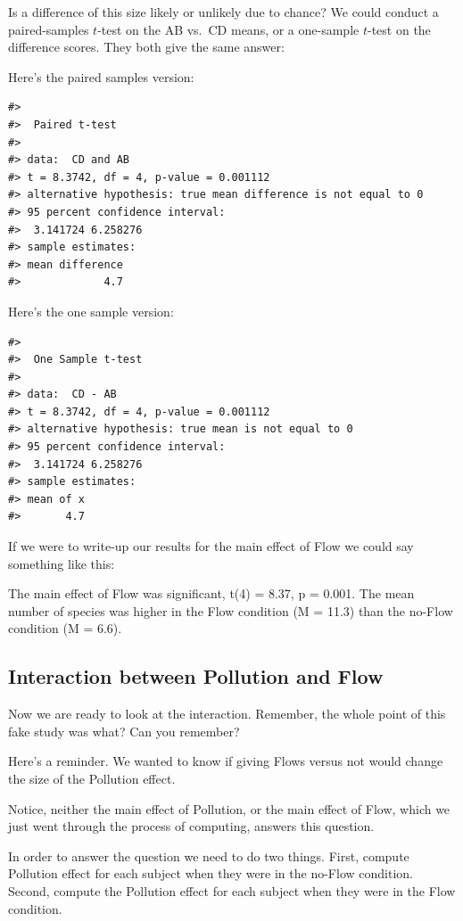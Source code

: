 \documentclass[
  letterpaper,
  DIV=11,
  numbers=noendperiod]{scrreprt}
\begin{document}
Is a difference of this size likely or unlikely due to chance? We could
conduct a paired-samples \(t\)-test on the AB vs.~CD means, or a
one-sample \(t\)-test on the difference scores. They both give the same
answer:

Here's the paired samples version:

\begin{verbatim}
#> 
#>  Paired t-test
#> 
#> data:  CD and AB
#> t = 8.3742, df = 4, p-value = 0.001112
#> alternative hypothesis: true mean difference is not equal to 0
#> 95 percent confidence interval:
#>  3.141724 6.258276
#> sample estimates:
#> mean difference 
#>             4.7
\end{verbatim}

Here's the one sample version:

\begin{verbatim}
#> 
#>  One Sample t-test
#> 
#> data:  CD - AB
#> t = 8.3742, df = 4, p-value = 0.001112
#> alternative hypothesis: true mean is not equal to 0
#> 95 percent confidence interval:
#>  3.141724 6.258276
#> sample estimates:
#> mean of x 
#>       4.7
\end{verbatim}

If we were to write-up our results for the main effect of Flow we could
say something like this:

The main effect of Flow was significant, t(4) = 8.37, p = 0.001. The
mean number of species was higher in the Flow condition (M = 11.3) than
the no-Flow condition (M = 6.6).

\subsection{Interaction between Pollution and
Flow}\label{interaction-between-pollution-and-flow}

Now we are ready to look at the interaction. Remember, the whole point
of this fake study was what? Can you remember?

Here's a reminder. We wanted to know if giving Flows versus not would
change the size of the Pollution effect.

Notice, neither the main effect of Pollution, or the main effect of
Flow, which we just went through the process of computing, answers this
question.

In order to answer the question we need to do two things. First, compute
Pollution effect for each subject when they were in the no-Flow
condition. Second, compute the Pollution effect for each subject when
they were in the Flow condition.
\end{document}
